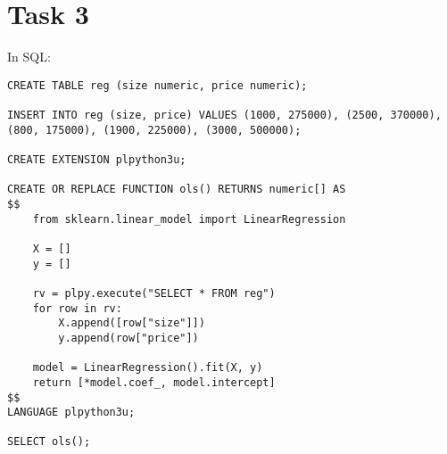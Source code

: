 \documentclass{article}
\begin{document}
	\section*{Task 3}
	In SQL:
	\begin{lstlisting}[tabsize=2]
CREATE TABLE reg (size numeric, price numeric);

INSERT INTO reg (size, price) VALUES (1000, 275000), (2500, 370000), (800, 175000), (1900, 225000), (3000, 500000);

CREATE EXTENSION plpython3u;

CREATE OR REPLACE FUNCTION ols() RETURNS numeric[] AS
$$
	from sklearn.linear_model import LinearRegression
	
	X = []
	y = []
	
	rv = plpy.execute("SELECT * FROM reg")
	for row in rv:
		X.append([row["size"]])
		y.append(row["price"])
	
	model = LinearRegression().fit(X, y)
	return [*model.coef_, model.intercept]
$$
LANGUAGE plpython3u;

SELECT ols();
	\end{lstlisting}
\end{document}
